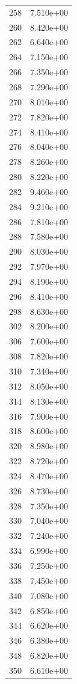 \documentclass[12pt]{article}
\begin{document}
\begin{longtable}{@{}cc@{}}
258 & 7.510e+00 \\
260 & 8.420e+00 \\
262 & 6.640e+00 \\
264 & 7.150e+00 \\
266 & 7.350e+00 \\
268 & 7.290e+00 \\
270 & 8.010e+00 \\
272 & 7.820e+00 \\
274 & 8.410e+00 \\
276 & 8.040e+00 \\
278 & 8.260e+00 \\
280 & 8.220e+00 \\
282 & 9.460e+00 \\
284 & 9.210e+00 \\
286 & 7.810e+00 \\
288 & 7.580e+00 \\
290 & 8.030e+00 \\
292 & 7.970e+00 \\
294 & 8.190e+00 \\
296 & 8.410e+00 \\
298 & 8.630e+00 \\
302 & 8.200e+00 \\
306 & 7.600e+00 \\
308 & 7.820e+00 \\
310 & 7.340e+00 \\
312 & 8.050e+00 \\
314 & 8.130e+00 \\
316 & 7.900e+00 \\
318 & 8.600e+00 \\
320 & 8.980e+00 \\
322 & 8.720e+00 \\
324 & 8.470e+00 \\
326 & 8.730e+00 \\
328 & 7.350e+00 \\
330 & 7.040e+00 \\
332 & 7.240e+00 \\
334 & 6.990e+00 \\
336 & 7.250e+00 \\
338 & 7.450e+00 \\
340 & 7.080e+00 \\
342 & 6.850e+00 \\
344 & 6.620e+00 \\
346 & 6.380e+00 \\
348 & 6.820e+00 \\
350 & 6.610e+00 \\

\end{longtable}
\end{document}
